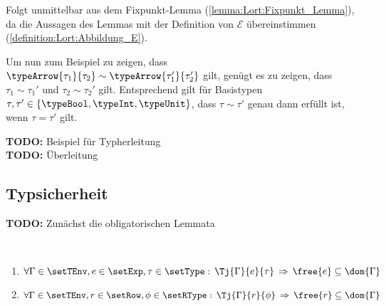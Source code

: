 \begin{beweis}
  Folgt unmittelbar aus dem Fixpunkt-Lemma (\ref{lemma:Lort:Fixpunkt_Lemma}), da die Aussagen des
  Lemmas mit der Definition von $\mathcal{E}$ \"ubereinstimmen (\ref{definition:Lort:Abbildung_E}).
\end{beweis}

Um nun zum Beispiel zu zeigen, dass $\typeArrow{\tau_1}{\tau_2} \sim \typeArrow{\tau_1'}{\tau_2'}$ gilt,
gen\"ugt es zu zeigen, dass $\tau_1 \sim \tau_1'$ und $\tau_2 \sim \tau_2'$ gilt. Entsprechend gilt
f\"ur Basistypen $\tau,\tau'\in\{\typeBool,\typeInt,\typeUnit\}$, dass $\tau \sim \tau'$ genau dann
erf\"ullt ist, wenn $\tau = \tau'$ gilt.


{\bf TODO:} Beispiel f\"ur Typherleitung \\
{\bf TODO:} \"Uberleitung



\subsection{Typsicherheit}

{\bf TODO:} Zun\"achst die obligatorischen Lemmata

\begin{lemma} \label{lemma:Lort:free_und_dom_Gamma} \
  \begin{enumerate}
    \item $\forall \Gamma \in \setTEnv, e\in\setExp,\tau\in\setType:\,
           \Tj{\Gamma}{e}{\tau}\,\Rightarrow\,\free{e}\subseteq\dom{\Gamma}$
    \item $\forall \Gamma \in \setTEnv, r\in\setRow,\phi\in\setRType:\,
           \Tj{\Gamma}{r}{\phi}\,\Rightarrow\,\free{r}\subseteq\dom{\Gamma}$
  \end{enumerate}
\end{lemma}

